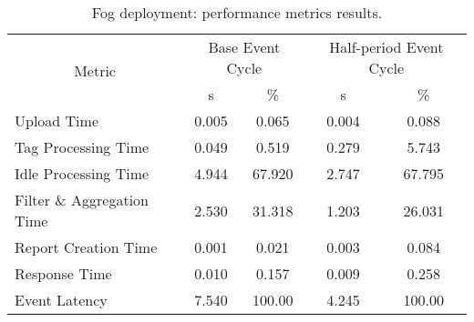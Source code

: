 \begin{table}[ht!]
\centering
\caption{Fog deployment: performance metrics results.}
\label{table:fog_metrics}
\begin{tabular}{|l|c|c|c|c|}
\hline
\multicolumn{1}{|c|}{\multirow{2}{*}{Metric}} & \multicolumn{2}{c|}{Base Event Cycle} & \multicolumn{2}{c|}{Half-period Event Cycle} \\
\multicolumn{1}{|c|}{}                        & s                 & \%                & s                    & \%                    \\ \hline
Upload Time                                   & 0.005             & 0.065             & 0.004                & 0.088                 \\ \hline
Tag Processing Time                           & 0.049             & 0.519             & 0.279                & 5.743                 \\ \hline
Idle Processing Time                          & 4.944             & 67.920            & 2.747                & 67.795                \\ \hline
Filter \& Aggregation Time                    & 2.530             & 31.318            & 1.203                & 26.031                \\ \hline
Report Creation Time                          & 0.001             & 0.021             & 0.003                & 0.084                 \\ \hline
Response Time                                 & 0.010             & 0.157             & 0.009                & 0.258                 \\ \hline
Event Latency                                 & 7.540             & 100.00            & 4.245                & 100.00                \\ \hline
\end{tabular}
\end{table}
